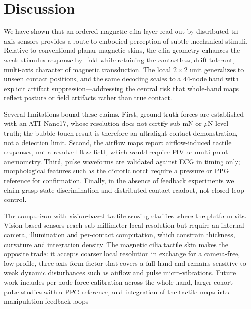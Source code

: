 \section*{Discussion}

We have shown that an ordered magnetic cilia layer read out by distributed
tri-axis sensors provides a route to embodied perception of subtle
mechanical stimuli. Relative to conventional planar magnetic skins, the
cilia geometry enhances the weak-stimulus response by
-fold while retaining the contactless,
drift-tolerant, multi-axis character of magnetic transduction. The local
$2\times2$ unit generalizes to unseen contact positions, and the same
decoding scales to a 44-node hand with explicit artifact
suppression---addressing the central risk that whole-hand maps reflect
posture or field artifacts rather than true contact.

Several limitations bound these claims. First, ground-truth forces are
established with an ATI~Nano17, whose resolution does not certify sub-mN or
$\mu$N-level truth; the bubble-touch result is therefore an
ultralight-contact demonstration, not a detection limit. Second, the
airflow maps report airflow-induced tactile responses, not a resolved flow
field, which would require PIV or multi-point anemometry. Third, pulse
waveforms are validated against ECG in timing only; morphological features
such as the dicrotic notch require a pressure or PPG reference for
confirmation. Finally, in the absence of feedback experiments we claim
grasp-state discrimination and distributed contact readout, not closed-loop
control.

The comparison with vision-based tactile sensing clarifies where the
platform sits. Vision-based sensors reach sub-millimeter local resolution
but require an internal camera, illumination and per-contact computation,
which constrain thickness, curvature and integration density. The magnetic
cilia tactile skin makes the opposite trade: it accepts coarser local
resolution in exchange for a camera-free, low-profile, three-axis form
factor that covers a full hand and remains sensitive to weak dynamic
disturbances such as airflow and pulse micro-vibrations. Future work
includes per-node force calibration across the whole hand, larger-cohort
pulse studies with a PPG reference, and integration of the tactile maps
into manipulation feedback loops.
